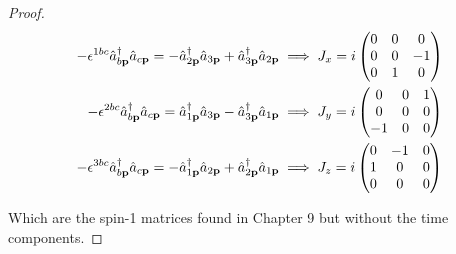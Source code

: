 \documentclass[letterpaper]{article}
\theoremstyle{definition}
\begin{document}
\begin{proof}
  \begin{align*}
    -\epsilon^{1bc}\hat{a}^\dagger_{b\vb{p}}\hat{a}_{c\vb{p}}  =-\hat{a}^\dagger_{2\vb{p}}\hat{a}_{3\vb{p}}+\hat{a}^\dagger_{3\vb{p}}\hat{a}_{2\vb{p}} & \implies J_x=i\begin{pmatrix}
      0 & 0 & 0  \\
      0 & 0 & -1 \\
      0 & 1 & 0  \\
    \end{pmatrix} \\
    -\epsilon^{2bc}\hat{a}^\dagger_{b\vb{p}}\hat{a}_{c\vb{p}}  =\hat{a}^\dagger_{1\vb{p}}\hat{a}_{3\vb{p}}-\hat{a}^\dagger_{3\vb{p}}\hat{a}_{1\vb{p}}  & \implies J_y=i\begin{pmatrix}
      0  & 0 & 1 \\
      0  & 0 & 0 \\
      -1 & 0 & 0 \\
    \end{pmatrix} \\
    -\epsilon^{3bc}\hat{a}^\dagger_{b\vb{p}}\hat{a}_{c\vb{p}}  =-\hat{a}^\dagger_{1\vb{p}}\hat{a}_{2\vb{p}}+\hat{a}^\dagger_{2\vb{p}}\hat{a}_{1\vb{p}} & \implies J_z=i\begin{pmatrix}
      0 & -1 & 0 \\
      1 & 0  & 0 \\
      0 & 0  & 0 \\
    \end{pmatrix} \\
  \end{align*}

  Which are the spin-1 matrices found in Chapter 9 but without the time components.
\end{proof}
\end{document}
